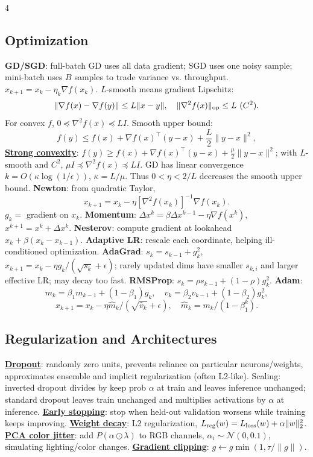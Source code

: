 \documentclass{article}
\newcommand{\key}[1]{\textbf{#1}}
\newcommand{\lowterm}[1]{\textbf{\underline{#1}}}
\newcommand{\N}{\mathcal{N}}
\newcommand{\1}{\mathbf 1}
\begin{document}
\begin{multicols*}{4}
\subsection{Optimization}
\key{GD/SGD}: full-batch GD uses all data gradient; SGD uses one noisy sample; mini-batch uses $B$ samples to trade variance vs. throughput. $x_{k+1}=x_k-\eta_k\nabla f(x_k)$. $L$-smooth means gradient Lipschitz:
\[
\|\nabla f(x)-\nabla f(y)\|\le L\|x-y\|,\quad
\|\nabla^2f(x)\|_{\rm op}\le L\ (C^2).
\]
For convex $f$, $0\preceq\nabla^2f(x)\preceq LI$. Smooth upper bound:
\[
f(y)\le f(x)+\nabla f(x)^\top(y-x)+\frac L2\|y-x\|^2,
\]
\lowterm{Strong convexity}: $f(y)\ge f(x)+\nabla f(x)^\top(y-x)+\frac\mu2\|y-x\|^2$; with $L$-smooth and $C^2$, $\mu I\preceq\nabla^2f(x)\preceq LI$. GD has linear convergence $k=O(\kappa\log(1/\epsilon))$, $\kappa=L/\mu$. Thus $0<\eta<2/L$ decreases the smooth upper bound. \key{Newton}: from quadratic Taylor,
\[
x_{k+1}=x_k-\eta[\nabla^2f(x_k)]^{-1}\nabla f(x_k).
\]
$g_k=$ gradient on $x_k$. 
\key{Momentum}: $\Delta x^k=\beta\Delta x^{k-1}-\eta\nabla f(x^k)$, $x^{k+1}=x^k+\Delta x^k$. \key{Nesterov}: compute gradient at lookahead $x_k+\beta(x_k-x_{k-1})$.
\key{Adaptive LR}: rescale each coordinate, helping ill-conditioned optimization. \key{AdaGrad}: $s_k=s_{k-1}+g_k^2$, $x_{k+1}=x_k-\eta g_k/(\sqrt{s_k}+\epsilon)$; rarely updated dims have smaller $s_{k,i}$ and larger effective LR; may decay too fast. \key{RMSProp}: $s_k=\rho s_{k-1}+(1-\rho)g_k^2$. \key{Adam}:
\[
m_k=\beta_1m_{k-1}+(1-\beta_1)g_k,\quad v_k=\beta_2v_{k-1}+(1-\beta_2)g_k^2,
\]
\[
x_{k+1}=x_k-\eta\hat m_k/(\sqrt{\hat v_k}+\epsilon),\quad
\hat m_k=m_k/(1-\beta_1^k).
\]

\subsection{Regularization and Architectures}
\lowterm{Dropout}: randomly zero units, prevents reliance on particular neurons/weights, approximates ensemble and implicit regularization (often L2-like). Scaling: inverted dropout divides by keep prob $\alpha$ at train and leaves inference unchanged; standard dropout leaves train unchanged and multiplies activations by $\alpha$ at inference. \lowterm{Early stopping}: stop when held-out validation worsens while training keeps improving. \lowterm{Weight decay}: L2 regularization,
$L_{\rm reg}(w)=L_{\rm loss}(w)+\alpha\|w\|_2^2$. \lowterm{PCA color jitter}: add $P(\alpha\odot\lambda)$ to RGB channels, $\alpha_i\sim\N(0,0.1)$, simulating lighting/color changes. \lowterm{Gradient clipping}: $g\leftarrow g\min(1,\tau/\|g\|)$.


\end{multicols*}
\end{document}
